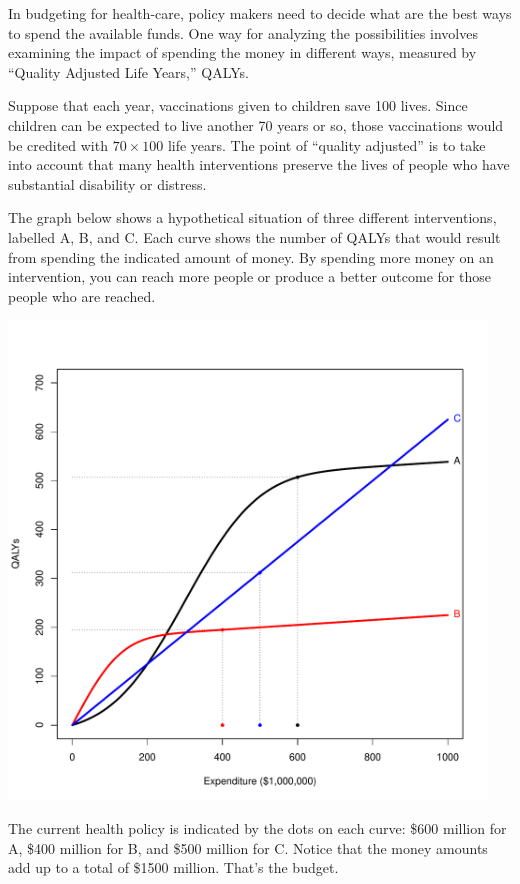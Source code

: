 


In budgeting for health-care,  policy makers need to decide what are
the best ways to spend the available funds.  One way for analyzing the
possibilities involves examining the impact of spending the money in
different ways, measured by ``Quality Adjusted Life Years,'' QALYs.

Suppose that each year, vaccinations given to children save 100
lives.  Since children can be expected to live another 70 years or so,
those vaccinations would be credited with $70 \times 100$ life years.
The point of ``quality adjusted'' is to take into account that many
health interventions preserve the lives of people who have substantial
disability or distress.

The graph below shows a hypothetical situation of three different
interventions, labelled A, B, and C.  Each curve shows the number of
QALYs that would result from spending the indicated amount of money.
By spending more money on an intervention, you can reach more people
or produce a better outcome for those people who are reached.  


\centerline{\includegraphics[width=5in]{Figures/tradeoffs-qaly1}}

The current health policy is indicated by the dots on each curve:
\$600 million for A, \$400 million for B, and \$500 million for C.
Notice that the money amounts add up to a total of \$1500 million.
That's the budget.


